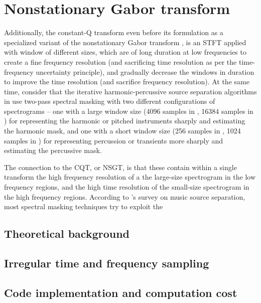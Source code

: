 \documentclass[letter,12pt,notitlepage]{article}
\begin{document}
\section{Nonstationary Gabor transform}
\label{sec:theorynsgt}

Additionally, the constant-Q transform \cite{jbrown, klapuricqt, invertiblecqt} even before its formulation as a specialized variant of the nonstationary Gabor transform \cite{balazs}, is an STFT applied with window of different sizes, which are of long duration at low frequencies to create a fine frequency resolution (and sacrificing time resolution as per the time-frequency uncertainty principle), and gradually decrease the windows in duration to improve the time resolution (and sacrifice frequency resolution). At the same time, consider that the iterative harmonic-percussive source separation algorithms in \cite{driedger, fitzgerald2} use two-pass spectral masking with two different configurations of spectrograms -- one with a large window size (4096 samples in \cite{driedger}, 16384 samples in \cite{fitzgerald2}) for representing the harmonic or pitched instruments sharply and estimating the harmonic mask, and one with a short window size (256 samples in \cite{driedger}, 1024 samples in \cite{fitzgerald2}) for representing percussion or transients more sharply and estimating the percussive mask.

The connection to the CQT, or NSGT, is that these contain within a single transform the high frequency resolution of a the large-size spectrogram in the low frequency regions, and the high time resolution of the small-size spectrogram in the high frequency regions. According to \citet{musicsepgood}'s survey on music source separation, most spectral masking techniques try to exploit the 

\subsection{Theoretical background}


\subsection{Irregular time and frequency sampling}


\subsection{Code implementation and computation cost}
\end{document}
